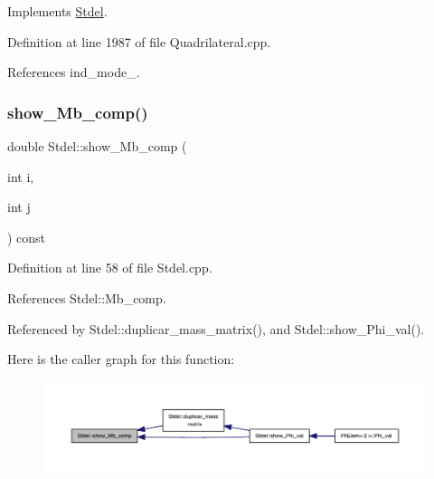 Implements \hyperlink{classStdel_aa97cf7534697be1f2e02ff540ed7433b}{Stdel}.



Definition at line 1987 of file Quadrilateral.\+cpp.



References ind\+\_\+mode\+\_\+.

\mbox{\label{classStdel_a4860f0f650640f859c5f75c206ee1f60}} 
\subsubsection{\texorpdfstring{show\+\_\+\+Mb\+\_\+comp()}{show\_Mb\_comp()}}
{\footnotesize\ttfamily double Stdel\+::show\+\_\+\+Mb\+\_\+comp (\begin{DoxyParamCaption}\item[{int}]{i,  }\item[{int}]{j }\end{DoxyParamCaption}) const\hspace{0.3cm}{\ttfamily [inherited]}}



Definition at line 58 of file Stdel.\+cpp.



References Stdel\+::\+Mb\+\_\+comp.



Referenced by Stdel\+::duplicar\+\_\+mass\+\_\+matrix(), and Stdel\+::show\+\_\+\+Phi\+\_\+val().

Here is the caller graph for this function\+:
\nopagebreak
\begin{figure}[H]
\begin{center}
\leavevmode
\includegraphics[width=350pt]{classStdel_a4860f0f650640f859c5f75c206ee1f60_icgraph}
\end{center}
\end{figure}
\mbox{\label{classStdel_a44d5aa234e02fb41afd5a4e5e45fadc4}} 
